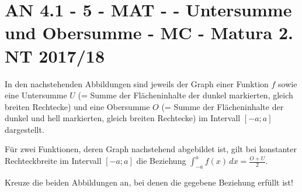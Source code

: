 \section{AN 4.1 - 5 - MAT - - Untersumme und Obersumme - MC - Matura 2. NT 2017/18}

\begin{beispiel}[AN 4.1]{1}
In den nachstehenden Abbildungen sind jeweils der Graph einer Funktion $f$ sowie eine Untersumme $U$ (= Summe der Flächeninhalte der dunkel markierten, gleich breiten Rechtecke) und eine Obersumme $O$ (= Summe der Flächeninhalte der dunkel und hell markierten, gleich breiten Rechtecke) im Intervall $[-a; a]$ dargestellt.

Für zwei Funktionen, deren Graph nachstehend abgebildet ist, gilt bei konstanter Rechteckbreite im Intervall $[-a; a]$ die Beziehung $\displaystyle\int_{-a}^{a} f(x)\,dx=\frac{O+U}{2}$. \leer

Kreuze die beiden Abbildungen an, bei denen die gegebene Beziehung erfüllt ist!


\end{beispiel}
